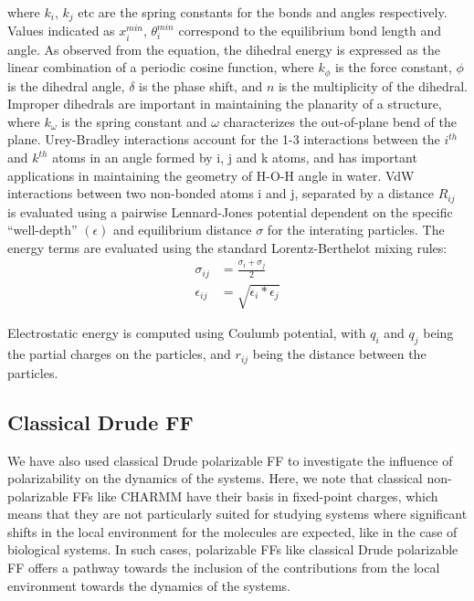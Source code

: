     where $k_i$, $k_j$ etc are the spring constants for the bonds and angles respectively. Values indicated as $x_{i}^{min}$, $\theta_{i}^{min}$ correspond to the equilibrium bond length and angle. As observed from the equation, the dihedral energy is expressed as the linear combination of a periodic cosine function, where $k_{\phi}$ is the force constant, $\phi$ is the dihedral angle, $\delta$ is the phase shift, and $n$ is the multiplicity of the dihedral. Improper dihedrals are important in maintaining the planarity of a structure, where $k_{\omega}$ is the spring constant and $\omega$ characterizes the out-of-plane bend of the plane. Urey-Bradley interactions account for the 1-3 interactions between the $i^{th}$ and $k^{th}$ atoms in an angle formed by i, j and k atoms, and has important applications in maintaining the geometry of H-O-H angle in water. VdW interactions between two non-bonded atoms i and j, separated by a distance $R_{ij}$ is evaluated using a pairwise Lennard-Jones potential dependent on the specific ``well-depth'' $(\epsilon)$ and equilibrium distance $\sigma$ for the interating particles. The energy terms are evaluated using the standard Lorentz-Berthelot mixing rules:
    \begin{align*}
        \sigma_{ij} &=   \frac{\sigma_i + \sigma_j}{2} \\
        \epsilon_{ij} &= \sqrt{\epsilon_i*\epsilon_j}
    \end{align*}

    Electrostatic energy is computed using Coulumb potential, with $q_i$ and $q_j$ being the partial charges on the particles, and $r_{ij}$ being the distance between the particles.

    \subsection[Classical Drude FF]{Classical Drude FF}
    We have also used classical Drude polarizable FF to investigate the influence of polarizability on the dynamics of the systems. Here, we note that classical non-polarizable FFs like CHARMM have their basis in fixed-point charges, which means that they are not particularly suited for studying systems where significant shifts in the local environment for the molecules are expected, like in the case of biological systems. In such cases, polarizable FFs like classical Drude polarizable FF offers a pathway towards the inclusion of the contributions from the local environment towards the dynamics of the systems.

